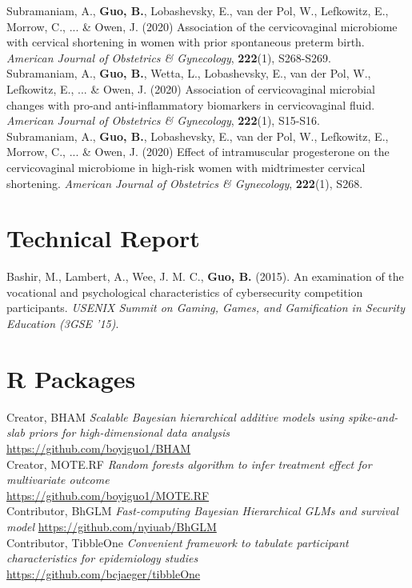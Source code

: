 Subramaniam, A., \textbf{Guo, B.}, Lobashevsky, E., van der Pol, W., Lefkowitz, E., Morrow, C., ... \& Owen, J.   (2020) Association of the cervicovaginal microbiome with cervical shortening in women with prior spontaneous preterm birth. \textit{American Journal of Obstetrics \& Gynecology}, {\bf 222}(1), S268-S269.\\

Subramaniam, A., \textbf{Guo, B.}, Wetta, L., Lobashevsky, E., van der Pol, W., Lefkowitz, E., ... \& Owen, J.  (2020) Association of cervicovaginal microbial changes with pro-and anti-inflammatory biomarkers in cervicovaginal fluid. \textit{American Journal of Obstetrics \& Gynecology}, {\bf 222}(1), S15-S16.\\

Subramaniam, A., \textbf{Guo, B.}, Lobashevsky, E., van der Pol, W., Lefkowitz, E., Morrow, C., ... \& Owen, J.  (2020) Effect of intramuscular progesterone on the cervicovaginal microbiome in high-risk women with midtrimester cervical shortening. \textit{American Journal of Obstetrics \& Gynecology}, {\bf 222}(1), S268.\\

\section{Technical Report}
Bashir, M., Lambert, A., Wee, J. M. C., \textbf{Guo, B.} (2015). An examination of the vocational and psychological characteristics of cybersecurity competition participants. \textit{USENIX Summit on Gaming, Games, and Gamification in Security Education (3GSE '15)}.


\section{R Packages}
\vspace{-3ex}

    Creator, BHAM {\it Scalable Bayesian hierarchical additive models using spike-and-slab  priors for high-dimensional data analysis}\\
    \url{https://github.com/boyiguo1/BHAM}\\
    
	Creator, MOTE.RF {\it Random forests algorithm to infer treatment effect for multivariate outcome}\\
	\url{https://github.com/boyiguo1/MOTE.RF}\\
	
	Contributor, BhGLM {\it Fast-computing Bayesian Hierarchical GLMs and survival model}
	\url{https://github.com/nyiuab/BhGLM}\\
	
	Contributor, TibbleOne {\it Convenient framework to tabulate participant characteristics for epidemiology studies}\\
	\url{https://github.com/bcjaeger/tibbleOne}\\
